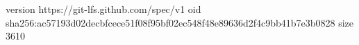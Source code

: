 version https://git-lfs.github.com/spec/v1
oid sha256:ac57193d02decbfcece51f08f95bf02ec548f48e89636d2f4c9bb41b7e3b0828
size 3610
